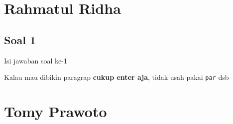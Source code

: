 
\section{Rahmatul Ridha}
\subsection{Soal 1}
Isi jawaban soal ke-1

Kalau mau dibikin paragrap \textbf{cukup enter aja}, tidak usah pakai \verb|par| dsb



\section{Tomy Prawoto}
